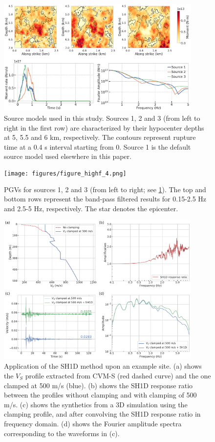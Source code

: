 \begin{figure}[!ht]
  \includegraphics[width=0.9\textwidth,height=0.9\textheight,keepaspectratio]{figures/figure_highf_3.pdf}
  \caption{Source models used in this study. Sources 1, 2 and 3 (from left to right in the first row) are characterized by their hypocenter depths at 5, 5.5 and 6 km, respectively. The contours represent rupture time at a 0.4 s interval starting from 0. Source 1 is the default source model used elsewhere in this paper.}
  \label{fig:highf-3}
\end{figure}
\clearpage

\begin{figure}[!ht]
  \texttt{[image: figures/figure\_highf\_4.png]}
  \caption{PGVs for sources 1, 2 and 3 (from left to right; see \cref{fig:highf-3}). The top and bottom rows represent the band-pass filtered results for 0.15-2.5 Hz and 2.5-5 Hz, respectively. The star denotes the epicenter.}
  \label{fig:highf-4}
\end{figure}
\clearpage

\begin{figure}[!ht]
  \centering
  \includegraphics[width=0.9\textwidth,height=0.9\textheight,keepaspectratio]{figures/figure_highf_5.pdf}
  \caption{Application of the SH1D method upon an example site. (a) shows the $V_S$ profile extracted from CVM-S (red dashed curve) and the one clamped at 500 m/s (blue). (b) shows the SH1D response ratio between the profiles without clamping and with clamping of 500 m/s. (c) shows the synthetics from a 3D simulation using the clamping profile, and after convolving the SH1D response ratio in frequency domain. (d) shows the Fourier amplitude spectra corresponding to the waveforms in (c).}
  \label{fig:highf-5}
\end{figure}
\clearpage

